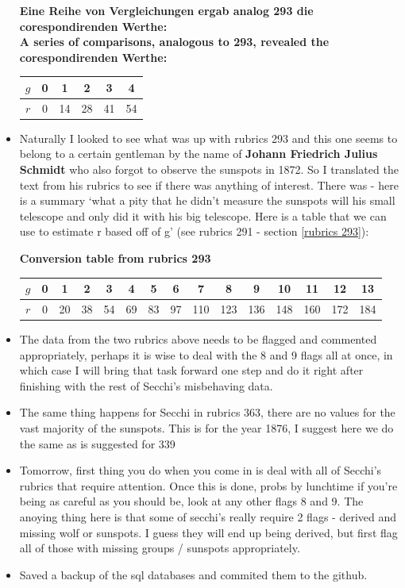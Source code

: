 \documentclass[12pt]{article}
\begin{document}
\begin{itemize}
{\centering
    \caption{\textbf{Eine Reihe von Vergleichungen ergab analog 293 die corespondirenden Werthe:\\
    A series of comparisons, analogous to 293, revealed the corespondirenden Werthe:}}
    \begin{tabular}{c|c c c c c}
        $g$ & 0 & 1 & 2 & 3 & 4 \\
        \hline
        $r$ & 0 & 14 & 28 & 41 & 54
    \end{tabular}
    
    \label{table:silly table}
\par}

    \item Naturally I looked to see what was up with rubrics 293 and this one seems to belong to a certain gentleman by the name of \textbf{Johann Friedrich Julius Schmidt} who also forgot to observe the sunspots in 1872. So I translated the text from his rubrics to see if there was anything of interest. There was - here is a summary `what a pity that he didn't measure the sunspots will his small telescope and only did it with his big telescope. Here is a table that we can use to estimate r based off of g' (see rubrics 291 - section \ref{rubrics 293}):
    
{\centering
    \caption{\textbf{Conversion table from rubrics 293}}
    \begin{tabular}{c|c c c c c c c c c c c c c c }
        $g$ & 0 & 1 & 2 & 3 & 4 & 5 & 6 & 7 & 8 & 9 & 10 & 11 & 12 & 13 \\
        \hline
        $r$ & 0 & 20 & 38 & 54 & 69 & 83 & 97 & 110 & 123 & 136 & 148 & 160 & 172 & 184
    \end{tabular}
    
    \label{table:silly table}
\par}

    \item The data from the two rubrics above needs to be flagged and commented appropriately, perhaps it is wise to deal with the 8 and 9 flags all at once, in which case I will bring that task forward one step and do it right after finishing with the rest of Secchi's misbehaving data.
    \item The same thing happens for Secchi in rubrics 363, there are no values for the vast majority of the sunspots. This is for the year 1876, I suggest here we do the same as is suggested for 339
    \item Tomorrow, first thing you do when you come in is deal with all of Secchi's rubrics that require attention. Once this is done, probs by lunchtime if you're being as careful as you should be, look at any other flags 8 and 9. The anoying thing here is that some of secchi's really require 2 flags - derived and missing wolf or sunspots. I guess they will end up being derived, but first flag all of those with missing groups / sunspots appropriately.
    \item Saved a backup of the sql databases and commited them to the github.
\end{itemize}
\end{document}
